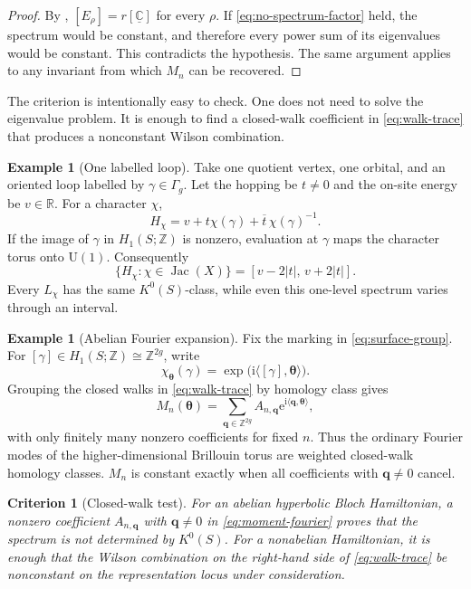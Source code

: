 \documentclass[11pt]{article}
\newtheorem{criterion}[theorem]{Criterion}
\theoremstyle{definition}
\newtheorem{example}[theorem]{Example}
\theoremstyle{remark}
\newcommand{\CC}{\mathbb C}
\newcommand{\RR}{\mathbb R}
\newcommand{\ZZ}{\mathbb Z}
\newcommand{\UU}{\mathrm U}
\newcommand{\Jac}{\operatorname{Jac}}
\newcommand{\ii}{\mathrm i}
\newcommand{\e}{\mathrm e}
\begin{document}
\begin{proof}
By , \([E_\rho]=r[\underline{\CC}]\) for every
\(\rho\).  If \eqref{eq:no-spectrum-factor} held, the spectrum would be
constant, and therefore every power sum of its eigenvalues would be constant.
This contradicts the hypothesis.  The same argument applies to any invariant
from which \(M_n\) can be recovered.
\end{proof}

The criterion is intentionally easy to check.  One does not need to solve the
eigenvalue problem.  It is enough to find a closed-walk coefficient in
\eqref{eq:walk-trace} that produces a nonconstant Wilson combination.

\begin{example}[One labelled loop]
\label{ex:one-loop}
Take one quotient vertex, one orbital, and an oriented loop labelled by
\(\gamma\in\Gamma_g\).  Let the hopping be \(t\neq0\) and the on-site energy
be \(v\in\RR\).  For a character \(\chi\),
\[
             H_\chi
              =v+t\chi(\gamma)+\overline t\,\chi(\gamma)^{-1}.
              \tag{4.7}\label{eq:one-loop-energy}
\]
If the image of \(\gamma\) in \(H_1(S;\ZZ)\) is nonzero, evaluation at
\(\gamma\) maps the character torus onto \(\UU(1)\).  Consequently
\[
 \{H_\chi:\chi\in\Jac(X)\}
      =[v-2|t|,\,v+2|t|].
 \tag{4.8}\label{eq:one-loop-range}
\]
Every \(L_\chi\) has the same \(K^0(S)\)-class, while even this one-level
spectrum varies through an interval.
\end{example}

\begin{example}[Abelian Fourier expansion]
\label{ex:abelian-fourier}
Fix the marking in \eqref{eq:surface-group}.  For
\([\gamma]\in H_1(S;\ZZ)\cong\ZZ^{2g}\), write
\[
 \chi_{\bm\theta}(\gamma)
    =\exp\!\bigl(\ii\langle[\gamma],\bm\theta\rangle\bigr).
\]
Grouping the closed walks in \eqref{eq:walk-trace} by homology class gives
\[
       M_n(\bm\theta)
          =\sum_{\bm q\in\ZZ^{2g}}A_{n,\bm q}
             \e^{\ii\langle\bm q,\bm\theta\rangle},
          \tag{4.9}\label{eq:moment-fourier}
\]
with only finitely many nonzero coefficients for fixed \(n\).  Thus the
ordinary Fourier modes of the higher-dimensional Brillouin torus are weighted
closed-walk homology classes.  \(M_n\) is constant exactly when all
coefficients with \(\bm q\neq0\) cancel.
\end{example}

\begin{criterion}[Closed-walk test]
\label{crit:closed-walk}
For an abelian hyperbolic Bloch Hamiltonian, a nonzero coefficient
\(A_{n,\bm q}\) with \(\bm q\neq0\) in \eqref{eq:moment-fourier} proves that
the spectrum is not determined by \(K^0(S)\).  For a nonabelian Hamiltonian,
it is enough that the Wilson combination on the right-hand side of
\eqref{eq:walk-trace} be nonconstant on the representation locus under
consideration.
\end{criterion}
\end{document}
